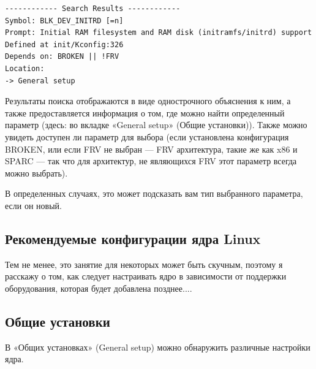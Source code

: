 \documentclass[10pt]{book}
\begin{document}
\vspace{3mm}
\begin{tcolorbox}[colback=gray!14!white, colframe=blue!75!blue]
\begin{lstlisting}
------------ Search Results ------------
Symbol: BLK_DEV_INITRD [=n]
Prompt: Initial RAM filesystem and RAM disk (initramfs/initrd) support
Defined at init/Kconfig:326
Depends on: BROKEN || !FRV
Location:
-> General setup
\end{lstlisting}
\end{tcolorbox}

Результаты поиска отображаются в виде однострочного объяснения к ним, а также предоставляется информация о том, где можно найти определенный параметр (здесь: во вкладке «General setup» (Общие установки)). Также можно увидеть доступен ли параметр для выбора (если установлена конфигурация BROKEN, или если FRV не выбран — FRV архитектура, такие же как x86 и SPARC — так что для архитектур, не являющихся FRV этот параметр всегда можно выбрать).

В определенных случаях, это может подсказать вам тип выбранного параметра, если он новый. 

\subsection{Рекомендуемые конфигурации ядра Linux}

Тем не менее, это занятие для некоторых может быть скучным, поэтому я расскажу о том, как следует настраивать ядро в зависимости от поддержки оборудования, которая будет добавлена позднее....


\subsection{Общие установки}

В «Общих установках» (General setup) можно обнаружить различные настройки ядра. 
\end{document}
